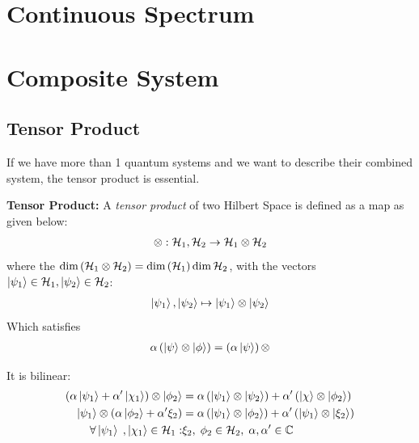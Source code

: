 \section{Continuous Spectrum}












\section{Composite System}
\subsection{Tensor Product} \label{sec:product_space}
If we have more than 1 quantum systems and we want to describe their combined system, the tensor product is essential. 
\begin{definition}{\textbf{Tensor Product:}}
    A \emph{tensor product} of two Hilbert Space is defined as a map as given below:
    \begin{eqnarray}
        \otimes: \mathcal{H}_1, \mathcal{H}_2 \rightarrow \mathcal{H}_1 \otimes \mathcal{H}_2
    \end{eqnarray}
    where the $\text{dim}\left(\mathcal{H}_1 \otimes \mathcal{H}_2\right) = \text{dim}\left(\mathcal{H}_1\right)\dim \mathcal{H}_2$, with the vectors $\ket{\psi_1} \in \mathcal{H}_1, \ket{\psi_2} \in \mathcal{H}_2$: 
    \begin{eqnarray}
        \ket{\psi_1}, \ket{\psi_2} \mapsto \ket{\psi_1} \otimes \ket {\psi_2} \label{eq:def_tensor_state}
    \end{eqnarray} 
    Which satisfies 
    \begin{align}
        \alpha\left(\ket{\psi} \otimes \ket{\phi}\right) = \left(\alpha \ket{\psi}\right) \otimes
    \end{align}
\end{definition}
It is bilinear: 
\begin{align}
    \left(\alpha \ket{\psi_1} + \alpha' \ket{\chi_1}\right) \otimes \ket{\phi_2} &= \alpha \left( \ket{\psi_1} \otimes \ket{\psi_2} \right) + \alpha'\left( \ket{\chi} \otimes \ket{\phi_2}\right) \\
    \ket{\psi_1} \otimes \left( \alpha \ket{\phi_2} + \alpha' \xi_2 \right) &= \alpha \left( \ket{\psi_1} \otimes \ket{\phi_2} \right) + \alpha' \left( \ket{\psi_1} \otimes \ket{\xi_2} \right) \\
    \forall \ket{\psi_1} \;,\ket{\chi_1} \in \mathcal{H}_1: &\xi_2,\; \phi_2 \in \mathcal{H}_2, \; \alpha, \alpha' \in \mathbb{C} \notag
\end{align}
